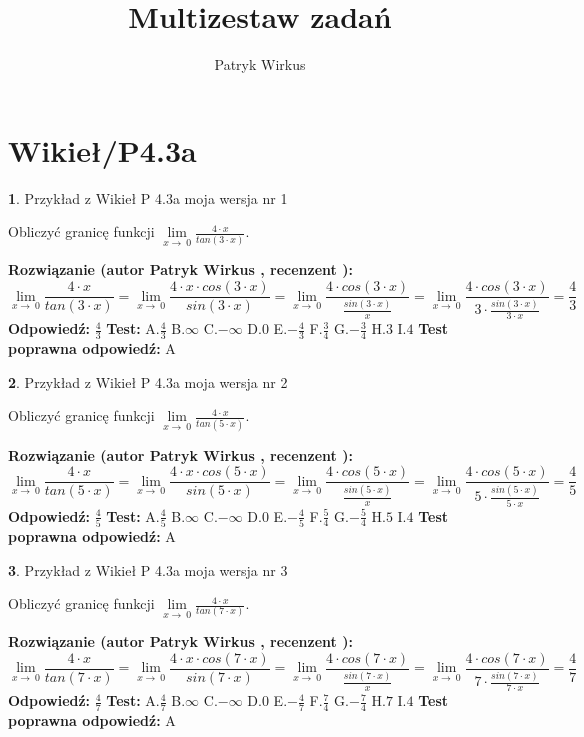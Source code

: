 \documentclass[12pt, a4paper]{article}
\title{Multizestaw zadań}
\author{Patryk Wirkus}
\date{}
\theoremstyle{definition} %
\newtheorem{zad}{}
\newcommand{\kategoria}[1]{\section{#1}}
\newcommand{\zadStart}[1]{\begin{zad}#1\newline}
\newcommand{\zadStop}{\end{zad}}
\newcommand{\rozwStart}[2]{\noindent \textbf{Rozwiązanie (autor #1 , recenzent #2): }\newline}
\newcommand{\rozwStop}{\newline}
\newcommand{\odpStart}{\noindent \textbf{Odpowiedź:}\newline}
\newcommand{\odpStop}{\newline}
\newcommand{\testStart}{\noindent \textbf{Test:}\newline}
\newcommand{\testStop}{\newline}
\newcommand{\kluczStart}{\noindent \textbf{Test poprawna odpowiedź:}\newline}
\newcommand{\kluczStop}{\newline}
\begin{document}
\maketitle

\kategoria{Wikieł/P4.3a}


\zadStart{Przykład z Wikieł P 4.3a moja wersja nr 1}


Obliczyć granicę funkcji $\lim\limits_{x\to\ 0}\frac{4 \cdot x}{tan(3 \cdot x)}$.
\zadStop
\rozwStart{Patryk Wirkus}{}
$$\lim\limits_{x\to\ 0}\frac{4 \cdot x}{tan(3 \cdot x)}=\lim\limits_{x\to\ 0}\frac{4 \cdot x \cdot cos(3 \cdot x)}{sin(3 \cdot x)}=\lim\limits_{x\to\ 0}\frac{4 \cdot cos(3 \cdot x)}{\frac{sin(3 \cdot x)}{x}}=\lim\limits_{x\to\ 0}\frac{4 \cdot cos(3 \cdot x)}{3 \cdot \frac{sin(3 \cdot x)}{3 \cdot x}} = \frac{4}{3}$$
\rozwStop
\odpStart
$\frac{4}{3}$
\odpStop
\testStart
A.$\frac{4}{3}$
B.$\infty$
C.$-\infty$
D.$0$
E.$-\frac{4}{3}$
F.$\frac{3}{4}$
G.$-\frac{3}{4}$
H.$3$
I.$4$
\testStop
\kluczStart
A
\kluczStop



\zadStart{Przykład z Wikieł P 4.3a moja wersja nr 2}


Obliczyć granicę funkcji $\lim\limits_{x\to\ 0}\frac{4 \cdot x}{tan(5 \cdot x)}$.
\zadStop
\rozwStart{Patryk Wirkus}{}
$$\lim\limits_{x\to\ 0}\frac{4 \cdot x}{tan(5 \cdot x)}=\lim\limits_{x\to\ 0}\frac{4 \cdot x \cdot cos(5 \cdot x)}{sin(5 \cdot x)}=\lim\limits_{x\to\ 0}\frac{4 \cdot cos(5 \cdot x)}{\frac{sin(5 \cdot x)}{x}}=\lim\limits_{x\to\ 0}\frac{4 \cdot cos(5 \cdot x)}{5 \cdot \frac{sin(5 \cdot x)}{5 \cdot x}} = \frac{4}{5}$$
\rozwStop
\odpStart
$\frac{4}{5}$
\odpStop
\testStart
A.$\frac{4}{5}$
B.$\infty$
C.$-\infty$
D.$0$
E.$-\frac{4}{5}$
F.$\frac{5}{4}$
G.$-\frac{5}{4}$
H.$5$
I.$4$
\testStop
\kluczStart
A
\kluczStop



\zadStart{Przykład z Wikieł P 4.3a moja wersja nr 3}


Obliczyć granicę funkcji $\lim\limits_{x\to\ 0}\frac{4 \cdot x}{tan(7 \cdot x)}$.
\zadStop
\rozwStart{Patryk Wirkus}{}
$$\lim\limits_{x\to\ 0}\frac{4 \cdot x}{tan(7 \cdot x)}=\lim\limits_{x\to\ 0}\frac{4 \cdot x \cdot cos(7 \cdot x)}{sin(7 \cdot x)}=\lim\limits_{x\to\ 0}\frac{4 \cdot cos(7 \cdot x)}{\frac{sin(7 \cdot x)}{x}}=\lim\limits_{x\to\ 0}\frac{4 \cdot cos(7 \cdot x)}{7 \cdot \frac{sin(7 \cdot x)}{7 \cdot x}} = \frac{4}{7}$$
\rozwStop
\odpStart
$\frac{4}{7}$
\odpStop
\testStart
A.$\frac{4}{7}$
B.$\infty$
C.$-\infty$
D.$0$
E.$-\frac{4}{7}$
F.$\frac{7}{4}$
G.$-\frac{7}{4}$
H.$7$
I.$4$
\testStop
\kluczStart
A
\kluczStop
\end{document}
